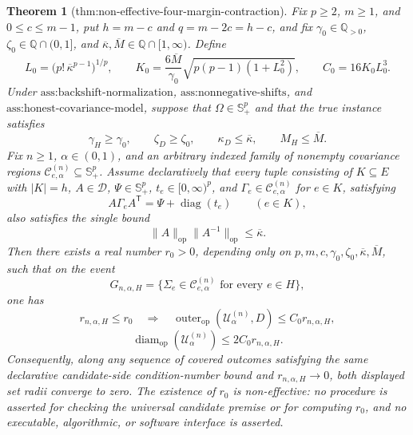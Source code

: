\documentclass{article}
\newtheorem{theorem}{Theorem}
\begin{document}
\begin{theorem}[thm:non-effective-four-margin-contraction]\label{thm:non-effective-four-margin-contraction}
Fix \(p\geq2\), \(m\geq1\), and \(0\leq c\leq m-1\), put \(h=m-c\) and \(q=m-2c=h-c\), and fix \(\gamma_0\in\mathbb Q_{>0}\), \(\zeta_0\in\mathbb Q\cap(0,1]\), and \(\overline\kappa,\overline M\in\mathbb Q\cap[1,\infty)\). Define
\[
L_0=\bigl(p!\,\overline\kappa^{p-1}\bigr)^{1/p},
\qquad
K_0=\frac{6\overline M}{\gamma_0}
\sqrt{p(p-1)(1+L_0^2)},
\qquad
C_0=16K_0L_0^3.
\]
Under \(\text{ass:backshift-normalization}\), \(\text{ass:nonnegative-shifts}\), and \(\text{ass:honest-covariance-model}\), suppose that \(\Omega\in\mathbb S_+^p\) and that the true instance satisfies
\[
\gamma_H\geq\gamma_0,\qquad
\zeta_D\geq\zeta_0,\qquad
\kappa_D\leq\overline\kappa,\qquad
M_H\leq\overline M.
\]
Fix \(n\geq1\), \(\alpha\in(0,1)\), and an arbitrary indexed family of nonempty covariance regions \(\mathcal C^{(n)}_{e,\alpha}\subseteq\mathbb S_{+}^p\). Assume declaratively that every tuple consisting of \(K\subseteq E\) with \(|K|=h\), \(A\in\mathcal D\), \(\Psi\in\mathbb S_+^p\), \(t_e\in[0,\infty)^p\), and \(\Gamma_e\in\mathcal C^{(n)}_{e,\alpha}\) for \(e\in K\), satisfying
\[
A\Gamma_eA^{\mathsf T}=\Psi+\operatorname{diag}(t_e)
\qquad(e\in K),
\]
also satisfies the single bound
\[
\|A\|_{\mathrm{op}}\|A^{-1}\|_{\mathrm{op}}
\leq\overline\kappa.
\]
Then there exists a real number \(r_0>0\), depending only on \(p,m,c,\gamma_0,\zeta_0,\overline\kappa,\overline M\), such that on the event
\[
G_{n,\alpha,H}
=\{\Sigma_e\in\mathcal C^{(n)}_{e,\alpha}\text{ for every }e\in H\},
\]
one has
\[
r_{n,\alpha,H}\leq r_0
\quad\Longrightarrow\quad
\operatorname{outer}_{\mathrm{op}}(\mathcal U^{(n)}_\alpha,D)
\leq C_0r_{n,\alpha,H},
\]
\[
\operatorname{diam}_{\mathrm{op}}(\mathcal U^{(n)}_\alpha)
\leq2C_0r_{n,\alpha,H}.
\]
Consequently, along any sequence of covered outcomes satisfying the same declarative candidate-side condition-number bound and \(r_{n,\alpha,H}\to0\), both displayed set radii converge to zero. The existence of \(r_0\) is non-effective: no procedure is asserted for checking the universal candidate premise or for computing \(r_0\), and no executable, algorithmic, or software interface is asserted.
\end{theorem}
\end{document}
